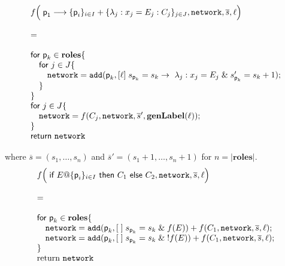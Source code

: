 \begin{displaymath}
  \begin{array}{ll}
    f\Big(\; \textsf{p}_1\longrightarrow\{\textsf{p}_i\}_{i\in I} +\{\lambda_j : x_j=E_j: C_j\}_{j\in J}, \texttt{network}, \overline{s}, \ell
    \Big)
    \\\\
    =
    \\\\
    \textsf{for } \textsf{p}_k \in \mathbf{roles} \{\\
    \quad\textsf{for } j \in J \{\\
    \quad\quad \texttt{network} = \texttt{add}(\textsf{p}_k,[\ell]\; {s_{\textsf{p}_k} = s_k} \rightarrow\ \lambda_j : x_j=E_j\;\& \;s_{\textsf{p}_k}'=s_k+1);\\
  	\quad\}\\
  	\}\\
	\textsf{for } j \in J \{\\
	\quad \texttt{network} = f(C_j, \texttt{network}, \overline{s}', \mathbf{genLabel(\ell)});  \\ 
	\}\\
  	\textsf{return } \texttt{network}
  \end{array}
\end{displaymath}

where $\overline{s} = (s_1, \ldots, s_n)$ and $\overline{s}' = (s_1+1, \ldots, s_n+1)$ for $n = |\mathbf{roles}|$.
\begin{displaymath}
  \begin{array}{ll}
    f\Big(\; \textsf{if } E@\{\textsf{p}_i\}_{i\in I} \textsf{ then } C_1 \textsf{ else } C_2, \texttt{network}, \overline{s}, \ell 
    \Big)
    \\\\
    =
    \\\\
    \textsf{for } \textsf{p}_k \in \mathbf{roles} \{\\
    \quad\texttt{network} = \texttt{add}(\textsf{p}_k,[\;]\; s_{\textsf{p}_k} = s_k \;\& \;f(E))+f(C_1, \texttt{network},\overline{s},\ell);\\
    \quad\texttt{network} = \texttt{add}(\textsf{p}_k,[\;]\; s_{\textsf{p}_k} = s_k \;\& \;!f(E))+f(C_1, \texttt{network},\overline{s},\ell);\\
  \}\\
  \text{return } \texttt {network}\\

  \end{array}
\end{displaymath}



